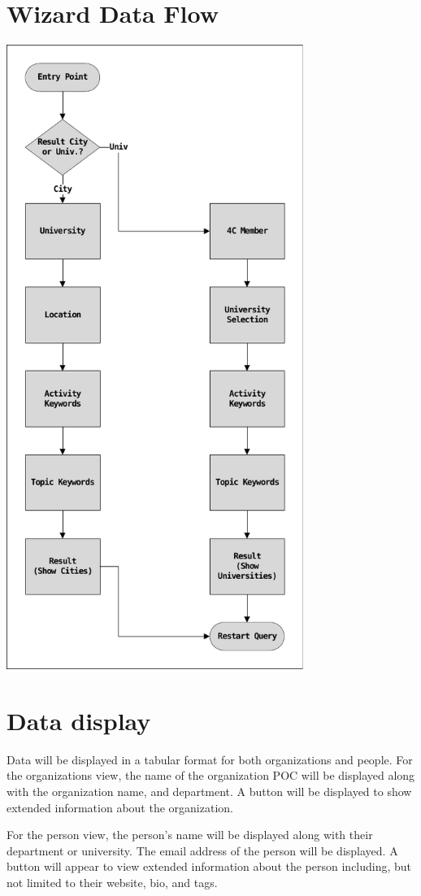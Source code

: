 \documentclass[11pt, hidelinks, letterpaper, obeyspaces]{article}
\begin{document}
\section{Wizard Data Flow}
\label{sec:wizardDataFlow}
\includegraphics[width=\textwidth,trim=4 4 4 4,clip,height=8in,keepaspectratio]{wizard-data-flow.pdf}
\newpage
\section{Data display}
\label{sec:dataDisplay}
Data will be displayed in a tabular format for both organizations and people.
For the organizations view, the name of the organization POC will be displayed
along with the organization name, and department. A button will be displayed to
show extended information about the organization.
\par For the person view, the person's name will be displayed along with their
department or university. The email address of the person will be displayed.
A button will appear to view extended information about the person including,
but not limited to their website, bio, and tags.
\end{document}
